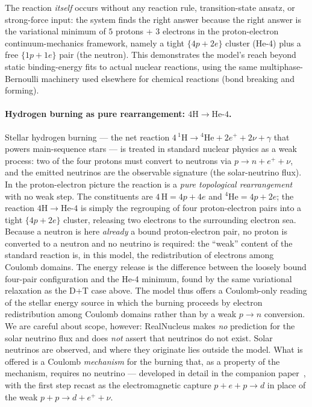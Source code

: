 \documentclass[11pt]{article}
\begin{document}
The reaction \emph{itself} occurs without any reaction rule, transition-state ansatz, or strong-force input: the system finds the right answer because the right answer is the variational minimum of $5$ protons + $3$ electrons in the proton-electron continuum-mechanics framework, namely a tight $\{4p + 2e\}$ cluster (He-4) plus a free $\{1p + 1e\}$ pair (the neutron). This demonstrates the model's reach beyond static binding-energy fits to actual nuclear reactions, using the same multiphase-Bernoulli machinery used elsewhere for chemical reactions (bond breaking and forming).

\paragraph{Hydrogen burning as pure rearrangement: $4\mathrm{H} \to \mathrm{He}\text{-}4$.}
Stellar hydrogen burning --- the net reaction $4\,{}^1\mathrm{H} \to {}^4\mathrm{He} + 2e^+ + 2\nu + \gamma$
that powers main-sequence stars --- is treated in standard nuclear physics as a weak process: two of
the four protons must convert to neutrons via $p \to n + e^+ + \nu$, and the emitted neutrinos are the
observable signature (the solar-neutrino flux). In the proton-electron picture the reaction is a
\emph{pure topological rearrangement} with no weak step. The constituents are $4\,\mathrm{H} = 4p + 4e$
and ${}^4\mathrm{He} = 4p + 2e$; the reaction $4\mathrm{H} \to \mathrm{He}\text{-}4$ is simply the
regrouping of four proton-electron pairs into a tight $\{4p+2e\}$ cluster, releasing two electrons to
the surrounding electron sea. Because a neutron is here \emph{already} a bound proton-electron pair,
no proton is converted to a neutron and no neutrino is required: the ``weak'' content of the standard
reaction is, in this model, the redistribution of electrons among Coulomb domains. The energy release
is the difference between the loosely bound four-pair configuration and the He-4 minimum, found by the
same variational relaxation as the D+T case above. The model thus offers a Coulomb-only reading of the
stellar energy source in which the burning proceeds by electron redistribution among Coulomb domains
rather than by a weak $p\to n$ conversion. We are careful about scope, however: RealNucleus makes
\emph{no} prediction for the solar neutrino flux and does \emph{not} assert that neutrinos do not exist.
Solar neutrinos are observed, and where they originate lies outside the model. What is offered is a
Coulomb \emph{mechanism} for the burning that, as a property of the mechanism, requires no neutrino ---
developed in detail in the companion paper~\cite{SolarFusion}, with the first step recast as the
electromagnetic capture $p+e+p\to d$ in place of the weak $p+p\to d+e^{+}+\nu$.
\end{document}
